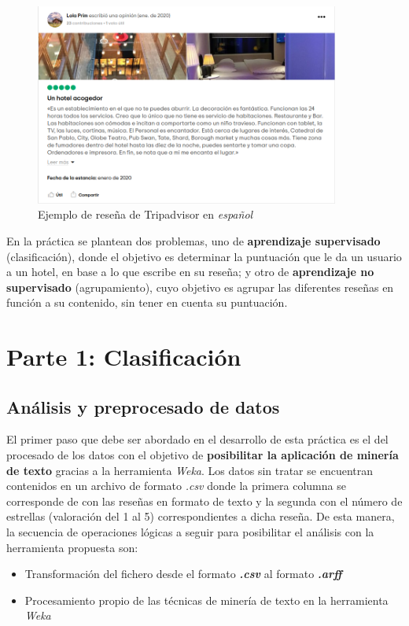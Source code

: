 \documentclass[12pt,a4paper, xcolor=table]{article}
\begin{document}
    \begin{figure}[!h]
      \centering
      \includegraphics[width=10cm]{img/tripadvisor-review.png}
      \caption{Ejemplo de reseña de Tripadvisor en \textit{español}}
    \end{figure}

    En la práctica se plantean dos problemas, uno de \textbf{aprendizaje supervisado} (clasificación), donde el objetivo es determinar la puntuación que le da un usuario a un hotel, en base a lo que escribe en su reseña; y otro de \textbf{aprendizaje no supervisado} (agrupamiento), cuyo objetivo es agrupar las diferentes reseñas en función a su contenido, sin tener en cuenta su puntuación.

    \vspace{3mm}


\section{Parte 1: Clasificación}
    \subsection{Análisis y preprocesado de datos}
        El primer paso que debe ser abordado en el desarrollo de esta práctica es el del procesado de los datos con el objetivo de \textbf{posibilitar la aplicación de minería de texto} gracias a la herramienta \textit{Weka}. Los datos sin tratar se encuentran contenidos en un archivo de formato \textit{.csv} donde la primera columna se corresponde de con las reseñas en formato de texto y la segunda con el número de estrellas (valoración del 1 al 5) correspondientes a dicha reseña. De esta manera, la secuencia de operaciones lógicas a seguir para posibilitar el análisis con la herramienta propuesta son:

        \begin{itemize}
        \item Transformación del fichero desde el formato \textbf{\textit{.csv}} al formato \textbf{\textit{.arff}}
        \item Procesamiento propio de las técnicas de minería de texto en la herramienta \textit{Weka}
        \end{itemize}
\end{document}
